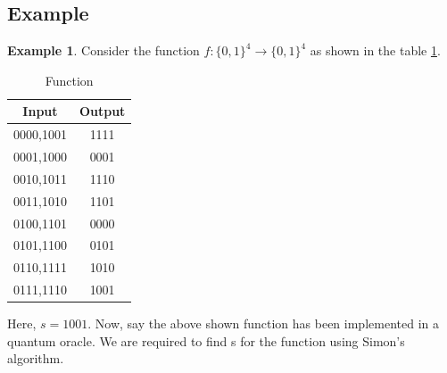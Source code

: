 \documentclass[12pt, oneside]{book}
\theoremstyle{definition}
\theoremstyle{definition}
\newtheorem{example}{Example}[section]
\theoremstyle{remark}
\begin{document}
\subsection{Example}
\begin{example}
    Consider the function $f:\{0,1\}^4\rightarrow \{0,1\}^4$ as shown in the table \ref{tab:simonex2}.
    \begin{table}[H]
        \centering
        \begin{tabular}{|c|c|}
            \hline
            Input & Output \\
            \hline
            0000,1001 & 1111 \\
            0001,1000 & 0001 \\
            0010,1011 & 1110 \\
            0011,1010 & 1101 \\
            0100,1101 & 0000 \\
            0101,1100 & 0101 \\
            0110,1111 & 1010 \\
            0111,1110 & 1001 \\
            \hline
        \end{tabular}
        \caption{Function}
        \label{tab:simonex2}
    \end{table}
    Here, $s=1001$. Now, say the above shown function has been implemented in a quantum oracle. We are required to find s for the function using Simon's algorithm.


\end{example}
\end{document}
